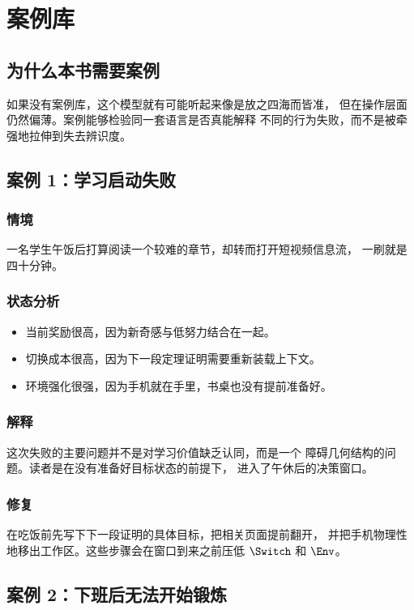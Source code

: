 \chapter{案例库}
\label{ch:cases}

\section{为什么本书需要案例}

如果没有案例库，这个模型就有可能听起来像是放之四海而皆准，
但在操作层面仍然偏薄。案例能够检验同一套语言是否真能解释
不同的行为失败，而不是被牵强地拉伸到失去辨识度。

\section{案例 1：学习启动失败}

\subsection*{情境}
一名学生午饭后打算阅读一个较难的章节，却转而打开短视频信息流，
一刷就是四十分钟。

\subsection*{状态分析}
\begin{itemize}[nosep]
  \item 当前奖励很高，因为新奇感与低努力结合在一起。
  \item 切换成本很高，因为下一段定理证明需要重新装载上下文。
  \item 环境强化很强，因为手机就在手里，书桌也没有提前准备好。
\end{itemize}

\subsection*{解释}
这次失败的主要问题并不是对学习价值缺乏认同，而是一个
障碍几何结构的问题。读者是在没有准备好目标状态的前提下，
进入了午休后的决策窗口。

\subsection*{修复}
在吃饭前先写下下一段证明的具体目标，把相关页面提前翻开，
并把手机物理性地移出工作区。这些步骤会在窗口到来之前压低
$\Switch$ 和 $\Env$。

\section{案例 2：下班后无法开始锻炼}

